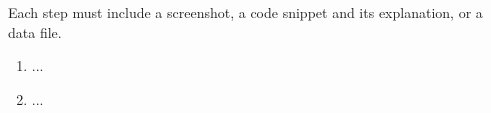 \pagebreak
\begin{answer}
	Each step must include a screenshot, a code snippet and its explanation, or a data file.
	\begin{enumerate}     
		\item ... 
		
		\item ... 
	\end{enumerate}
\end{answer}
%
%
%	
%	
